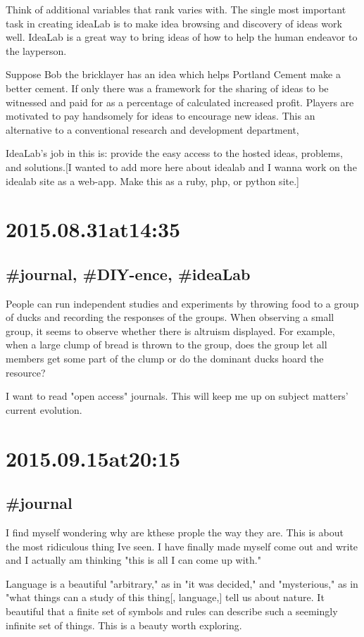 Think of additional variables that rank varies with. The single most important task in creating ideaLab is to make idea browsing and discovery of ideas work well. IdeaLab is a great way to bring ideas of how to help the human endeavor to the layperson.

Suppose Bob the bricklayer has an idea which helps Portland Cement make a better cement. If only there was a framework for the sharing of ideas to be witnessed and paid for as a percentage of calculated increased profit. Players are motivated to pay handsomely for ideas to encourage new ideas. This an alternative to a conventional research and development department,

IdeaLab's job in this is:  provide the easy access to the hosted ideas, problems, and solutions.[I wanted to add more here about idealab and I wanna work on the idealab site as a web-app. Make this as a ruby, php, or python site.]

\section*{2015.08.31at14:35}
\subsection*{#journal, #DIY-ence, #ideaLab}
People can run independent studies and experiments by throwing food to a group of ducks and recording the responses of the groups. When observing a small group, it seems to observe whether there is altruism displayed. For example, when a large clump of bread is thrown to the group, does the group let all members get some part of the clump or do the dominant ducks hoard the resource?

I want to read "open access" journals. This will keep me up on subject matters' current evolution.

\section*{2015.09.15at20:15}
\subsection*{#journal}
I find myself wondering why are kthese prople the way they are. This is about the most ridiculous thing Ive seen. I have finally made myself come out and write and I actually am thinking "this is all I can come up with."

Language is a beautiful "arbitrary," as in "it was decided," and "mysterious," as in "what things can a study of this thing[, language,] tell us about nature. It beautiful that a finite set of symbols and rules can describe such a seemingly infinite set of things. This is a beauty worth exploring.

